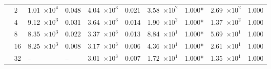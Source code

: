 \begin{table}[h]
\begin{center}
\begin{tiny}
\begin{sc}
\begin{tabular}{|c|l|p{1.2cm}|p{0.9cm}|p{1.2cm}|p{0.9cm}|p{1.2cm}|p{0.9cm}|p{1.2cm}|p{0.9cm}|}
                    & 2  & 1.01~$\times10^{4}$ & 0.048 & 4.04~$\times10^{3}$ & 0.021 & 3.58~$\times10^{2}$ & 1.000* & 2.69~$\times10^{2}$ & 1.000 \\\cline{2-10}
                    & 4  & 9.12~$\times10^{3}$ & 0.031 & 3.64~$\times10^{3}$ & 0.014 & 1.90~$\times10^{2}$ & 1.000* & 1.37~$\times10^{2}$ & 1.000 \\\cline{2-10}
                    & 8  & 8.35~$\times10^{3}$ & 0.022 & 3.37~$\times10^{3}$ & 0.013 & 8.84~$\times10^{1}$ & 1.000* & 5.69~$\times10^{1}$ & 1.000 \\\cline{2-10}
                    & 16 & 8.25~$\times10^{3}$ & 0.008 & 3.17~$\times10^{3}$ & 0.006 & 4.36~$\times10^{1}$ & 1.000* & 2.61~$\times10^{1}$ & 1.000 \\\cline{2-10}
                    & 32 & --                  & --    & 3.01~$\times10^{3}$ & 0.007 & 1.72~$\times10^{1}$ & 1.000* & 1.35~$\times10^{1}$ & 1.000 \\
                    \hline
                \end{tabular}
            \end{sc}
        \end{tiny}
    \end{center}
    \vskip -0.1in
\end{table}
